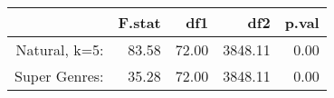 \begin{table}[ht]
\centering
\begin{tabular}{rrrrr}
  \hline
 & F.stat & df1 & df2 & p.val \\ 
  \hline
Natural, k=5: & 83.58 & 72.00 & 3848.11 & 0.00 \\ 
  Super Genres: & 35.28 & 72.00 & 3848.11 & 0.00 \\ 
   \hline
\end{tabular}
\end{table}
